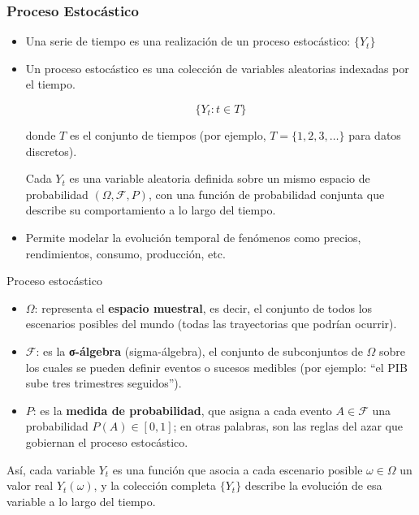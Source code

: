 \documentclass{beamer}
\begin{document}
\begin{frame}
\frametitle{Proceso Estocástico}
\begin{itemize}
    \item Una serie de tiempo es una realización de un proceso estocástico: \(\{Y_t\}\)
    \item Un proceso estocástico es una colección de variables aleatorias indexadas por el tiempo.

    \[
\{ Y_t : t \in T \}
\]

donde \( T \) es el conjunto de tiempos (por ejemplo, \( T = \{1, 2, 3, \dots\} \) para datos discretos).

Cada \( Y_t \) es una variable aleatoria definida sobre un mismo espacio de probabilidad 
\((\Omega, \mathcal{F}, P)\), con una función de probabilidad conjunta que describe su comportamiento 
a lo largo del tiempo.

    \item Permite modelar la evolución temporal de fenómenos como precios, rendimientos, consumo, producción, etc.
\end{itemize}


\end{frame}

\begin{frame}{Proceso estocástico}
   \begin{itemize}
    \item \( \Omega \): representa el \textbf{espacio muestral}, es decir, el conjunto de todos los escenarios posibles del mundo 
    (todas las trayectorias que podrían ocurrir).

    \item \( \mathcal{F} \): es la \textbf{σ-álgebra} (sigma-álgebra), el conjunto de subconjuntos de \( \Omega \) sobre los cuales 
    se pueden definir eventos o sucesos medibles (por ejemplo: ``el PIB sube tres trimestres seguidos'').

    \item \( P \): es la \textbf{medida de probabilidad}, que asigna a cada evento \( A \in \mathcal{F} \) una probabilidad
    \( P(A) \in [0,1] \); en otras palabras, son las reglas del azar que gobiernan el proceso estocástico.
\end{itemize}

Así, cada variable \( Y_t \) es una función que asocia a cada escenario posible \( \omega \in \Omega \) 
un valor real \( Y_t(\omega) \), y la colección completa \( \{Y_t\} \) describe la evolución de esa variable a lo largo del tiempo.
 
\end{frame}
\end{document}
